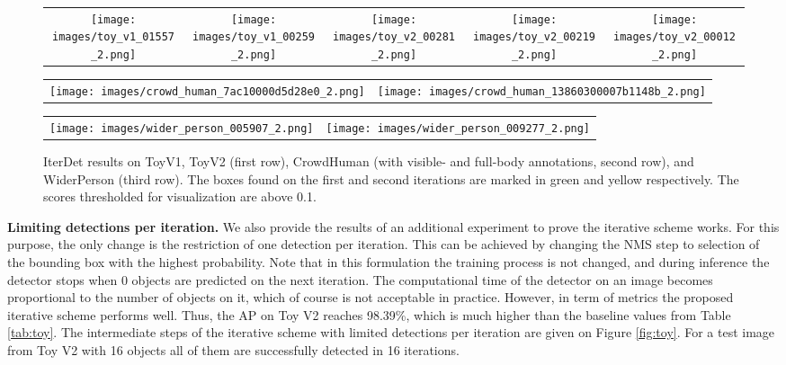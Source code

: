 \documentclass[runningheads]{llncs}
\begin{document}
\begin{figure*}[t]
\centering
\setlength{\tabcolsep}{2pt}
\renewcommand{\arraystretch}{0.75}
\begin{tabular}{ccccc}
    \texttt{[image: images/toy\_v1\_01557\_2.png]} &
    \texttt{[image: images/toy\_v1\_00259\_2.png]} &
    \texttt{[image: images/toy\_v2\_00281\_2.png]} &
    \texttt{[image: images/toy\_v2\_00219\_2.png]} &
    \texttt{[image: images/toy\_v2\_00012\_2.png]} \\
\end{tabular}
\begin{tabular}{cc}
    \texttt{[image: images/crowd\_human\_7ac10000d5d28e0\_2.png]} &
    \texttt{[image: images/crowd\_human\_13860300007b1148b\_2.png]} \\
\end{tabular}
\begin{tabular}{cc}
    \texttt{[image: images/wider\_person\_005907\_2.png]} &
    \texttt{[image: images/wider\_person\_009277\_2.png]} \\
\end{tabular}
\caption{IterDet results on ToyV1, ToyV2 (first row), CrowdHuman (with visible- and full-body annotations, second row), and WiderPerson (third row). The boxes found on the first and second iterations are marked in green and yellow respectively. The scores thresholded for visualization are above 0.1.}
\label{fig:examples}
\end{figure*}

\textbf{Limiting detections per iteration.} We also provide the results of an additional experiment to prove the iterative scheme works. For this purpose, the only change is the restriction of one detection per iteration. This can be achieved by changing the NMS step to selection of the bounding box with the highest probability. Note that in this formulation the training process is not changed, and during inference the detector stops when 0 objects are predicted on the next iteration. The computational time of the detector on an image becomes proportional to the number of objects on it, which of course is not acceptable in practice. However, in term of metrics the proposed iterative scheme performs well. Thus, the AP on Toy V2 reaches 98.39\%, which is much higher than the baseline values from Table \ref{tab:toy}. The intermediate steps of the iterative scheme with limited detections per iteration are given on Figure \ref{fig:toy}. For a test image from Toy V2 with 16 objects all of them are successfully detected in 16 iterations.
\end{document}
